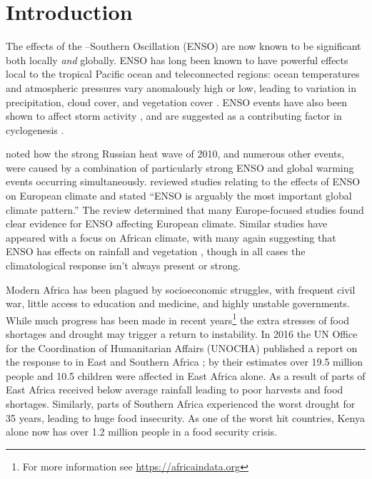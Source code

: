 \section{Introduction}

The effects of the \elnino{}--Southern Oscillation (ENSO) are now known to be
significant both locally \emph{and} globally. ENSO has long been known to have
powerful effects local to the tropical Pacific ocean and teleconnected regions:
ocean temperatures and atmospheric pressures vary anomalously high or low,
leading to variation in precipitation, cloud cover, and vegetation cover
\citep{philander1990}. ENSO events have also been shown to affect storm activity
\citep{wang2002}, and are suggested as a contributing factor in cyclogenesis
\citep{sobel2000}.

\cite{trenberth2012} noted how the strong Russian heat wave of 2010, and
numerous other events, were caused by a combination of particularly strong ENSO
and global warming events occurring simultaneously. \cite{bronnimann2007}
reviewed studies relating to the effects of ENSO on European climate and stated
``ENSO is arguably the most important global climate pattern.'' The review
determined that many Europe-focused studies found clear evidence for ENSO
affecting European climate. Similar studies have appeared with a focus on
African climate, with many again suggesting that ENSO has effects on rainfall
\citep{kane2009} and vegetation \citep{anyamba1996, anyamba2001, anyamba2002},
though in all cases the climatological response isn't always present or strong.

\vspace{0.5cm}

Modern Africa has been plagued by socioeconomic struggles, with frequent civil
war, little access to education and medicine, and highly unstable
governments. While much progress has been made in recent years\footnote{For more
  information see \url{https://africaindata.org}} the extra stresses of food
shortages and drought may trigger a return to instability.
In 2016 the UN Office for the Coordination of Humanitarian Affairs (UNOCHA)
published a report on the response to \elnino{} in East and Southern Africa
\citep{unocha2016}; by their estimates over 19.5 million people and 10.5
children were affected in East Africa alone. As a result of \elnino{} parts of
East Africa received below average rainfall leading to poor harvests and food
shortages. Similarly, parts of Southern Africa experienced the worst drought for
35 years, leading to huge food insecurity. As one of the worst hit countries,
Kenya alone now has over 1.2 million people in a food security crisis.

